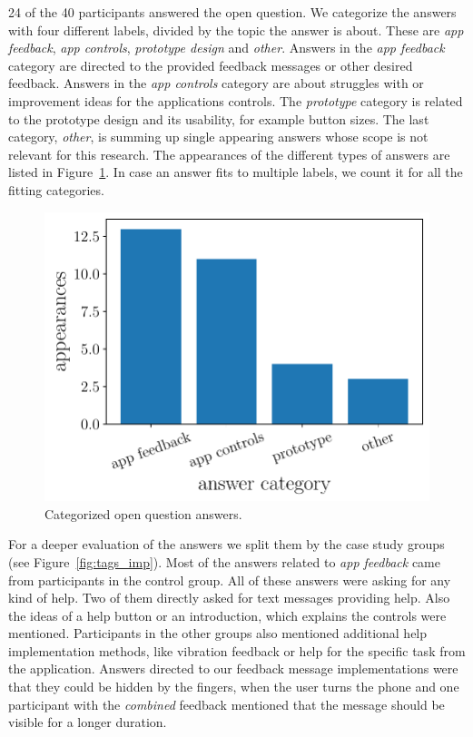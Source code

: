 \documentclass[manuscript]{acmart}
\begin{document}
			24 of the 40 participants answered the open question. We categorize the answers with four different labels, divided by the topic the answer is about. These are \emph{app feedback}, \emph{app controls}, \emph{prototype design} and \emph{other}. Answers in the \emph{app feedback} category are directed to the provided feedback messages or other desired feedback. Answers in the \emph{app controls} category are about struggles with or improvement ideas for the applications controls. The \emph{prototype} category is related to the prototype design and its usability, for example button sizes. The last category, \emph{other}, is summing up single appearing answers whose scope is not relevant for this research. The appearances of the different types of answers are listed in Figure~\ref{fig:tags}. In case an answer fits to multiple labels, we count it for all the fitting categories.

			\begin{figure}[H]
				\centering
				\includegraphics[width=.49\textwidth]{img/plot/plot_tags.pdf}
				\caption{Categorized open question answers.}
				\label{fig:tags}
			\end{figure}
			
			For a deeper evaluation of the answers we split them by the case study groups (see Figure~\ref{fig:tags_imp}). 
			Most of the answers related to \emph{app feedback} came from participants in the control group. All of these answers were asking for any kind of help. Two of them directly asked for text messages providing help. Also the ideas of a help button or an introduction, which explains the controls were mentioned. Participants in the other groups also mentioned additional help implementation methods, like vibration feedback or help for the specific task from the application. Answers directed to our feedback message implementations were that they could be hidden by the fingers, when the user turns the phone and one participant with the \emph{combined} feedback mentioned that the message should be visible for a longer duration.
\end{document}
